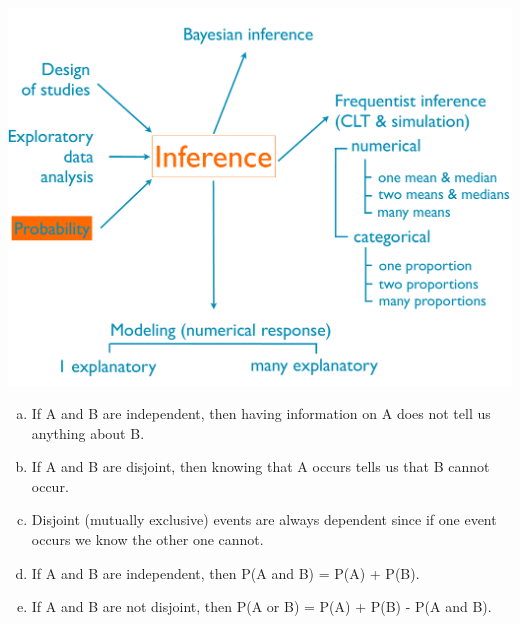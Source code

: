 \documentclass[slidestop,compress,mathserif,12pt,t,professionalfonts,xcolor=table]{beamer}
\newcommand{\solnMult}[1]{#1}
\begin{document}
\begin{frame}

{
{\scriptsize
{}}}
{
 \includegraphics[width=\textwidth]{figures/map/probability}
}

\vfill

{\footnotesize
\begin{enumerate}[(a)]
\item If A and B are independent, then having information on A does not tell us anything about B.
\item If A and B are disjoint, then knowing that A occurs tells us that B cannot occur.
\item Disjoint (mutually exclusive) events are always dependent since if one event occurs we know the other one cannot.
\item \solnMult{If A and B are independent, then P(A and B) = P(A) + P(B).}
\item If A and B are not disjoint, then P(A or B) = P(A) + P(B) - P(A and B).
\end{enumerate}
}

\end{frame}

\end{document}
